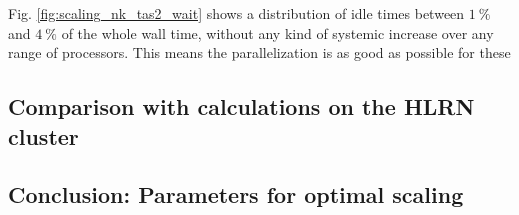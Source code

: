 \documentclass[main.tex]{subfiles}
\begin{document}
Fig. \ref{fig:scaling_nk_tas2_wait} shows a distribution of idle times between \(\SI{1}{\percent}\) and \(\SI{4}{\percent}\) of the whole wall time, without any kind of systemic increase over any range of processors.
This means the parallelization is as good as possible for these 

\subsection{Comparison with calculations on the HLRN cluster}

\subsection{Conclusion: Parameters for optimal scaling}
\end{document}
